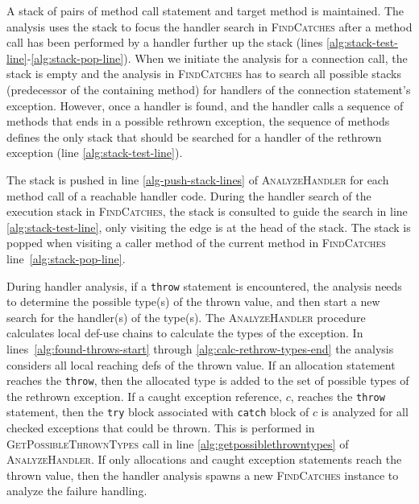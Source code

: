 A stack of pairs of method call statement and target method is
maintained.  The analysis uses the stack to focus the handler search
in \textsc{FindCatches} after a method call has been performed by a
handler further up the stack (lines
\ref{alg:stack-test-line}-\ref{alg:stack-pop-line}). When we initiate the analysis for a
connection call, the stack is empty and the analysis in
\textsc{FindCatches} has to search all possible stacks (predecessor of
the containing method) for handlers of the connection statement's
exception.  However, once a handler is found, and the handler calls a
sequence of methods that ends in a possible rethrown exception, the
sequence of methods defines the only stack that should be searched for
a handler of the rethrown exception (line \ref{alg:stack-test-line}).

The stack is pushed in line \ref{alg-push-stack-lines} of
\textsc{AnalyzeHandler} for each method call of a reachable handler
code.  During the handler search of the execution stack in
\textsc{FindCatches}, the stack is consulted to guide the search in
line \ref{alg:stack-test-line}, only visiting the edge is at the head
of the stack. The stack is popped when visiting a caller method of the
current method in \textsc{FindCatches} line~\ref{alg:stack-pop-line}.

During handler analysis, if a \lstinline!throw! statement is
encountered, the analysis needs to
determine the possible type(s) of the thrown value, and then start a new
search for the handler(s) of the type(s).  The \textsc{AnalyzeHandler} procedure
calculates local def-use chains to calculate the types of the
exception.  In lines~\ref{alg:found-throws-start} through
\ref{alg:calc-rethrow-types-end} the analysis considers all local
reaching defs of the thrown value.  If an allocation statement
reaches the \lstinline!throw!, then the allocated type is added to the
set of possible types of the rethrown exception. If a caught exception
reference, $c$, reaches
the \lstinline!throw! statement, then the \lstinline!try! block
associated with \lstinline!catch! block of $c$ is analyzed for all
checked exceptions that could be thrown.  This is performed in
\textsc{GetPossibleThrownTypes} call in line
\ref{alg:getpossiblethrowntypes} of \textsc{AnalyzeHandler}.  If only
allocations and caught exception statements reach the thrown value,
then the handler analysis spawns a new \textsc{FindCatches} instance
to analyze the failure handling.



